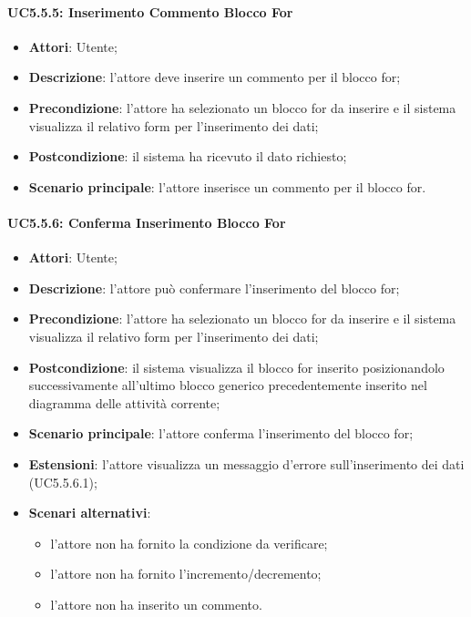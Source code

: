 \paragraph{UC5.5.5: Inserimento Commento Blocco For}
\label{UC5.5.5}
\begin{itemize}
	\item \textbf{Attori}: Utente;
	\item \textbf{Descrizione}: l'attore deve inserire un commento per il blocco for;
	\item \textbf{Precondizione}: l'attore ha selezionato un blocco for da inserire e il sistema visualizza il relativo form per l'inserimento dei dati;
	\item \textbf{Postcondizione}: il sistema ha ricevuto il dato richiesto;
	\item \textbf{Scenario principale}: l'attore inserisce un commento per il blocco for.
\end{itemize}

\paragraph{UC5.5.6: Conferma Inserimento Blocco For}
\label{UC5.5.6}
\begin{itemize}
	\item \textbf{Attori}: Utente;
	\item \textbf{Descrizione}: l'attore può confermare l'inserimento del blocco for;
	\item \textbf{Precondizione}: l'attore ha selezionato un blocco for da inserire e il sistema visualizza il relativo form per l'inserimento dei dati;
	\item \textbf{Postcondizione}: il sistema visualizza il blocco for inserito posizionandolo successivamente all'ultimo blocco generico precedentemente inserito nel diagramma delle attività corrente;
	\item \textbf{Scenario principale}: l'attore conferma l'inserimento del blocco for;
	\item \textbf{Estensioni}: l'attore visualizza un messaggio d'errore sull'inserimento dei dati (UC5.5.6.1);
	\item \textbf{Scenari alternativi}:
	\begin{itemize}
		\item l'attore non ha fornito la condizione da verificare;
		\item l'attore non ha fornito l'incremento/decremento;
		\item l'attore non ha inserito un commento.
	\end{itemize}
\end{itemize}

